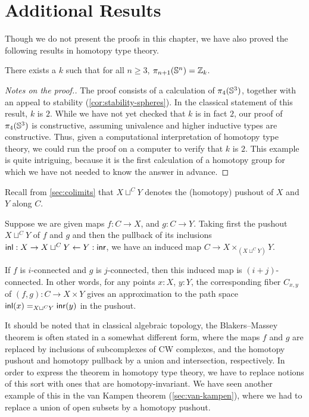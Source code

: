 \section{Additional Results}
\label{sec:moreresults}

Though we do not present the proofs in this chapter, we have also proved
the following results in homotopy type theory.  

\begin{thm}
There exists a $k$ such that for all $n \ge 3$, $\pi_{n+1}(\Sn ^n) =
\Z_k$.  
\end{thm}

\begin{proof}[Notes on the proof.]
The proof consists of a calculation of $\pi_4(\Sn ^3)$, together with an
appeal to stability (\cref{cor:stability-spheres}).  In the classical
statement of this result, $k$ is $2$.  While we have not yet checked that
$k$ is in fact $2$, our proof of $\pi_4(\Sn ^3)$ is constructive, assuming
univalence and higher inductive types are constructive.  Thus, given a
computational interpretation of homotopy type theory, we could run the
proof on a computer to verify that $k$ is $2$.  This example is quite
intriguing, because it is the first calculation of a homotopy group
for which we have not needed to know the answer in advance.
\end{proof}

Recall from \autoref{sec:colimits} that $X \sqcup^C Y$ denotes the
(homotopy) pushout of $X$ and $Y$ along $C$.
%

\begin{thm}\label{Blakers-Massey}
  Suppose we are given maps $f : C  \rightarrow X$, and $g : C \rightarrow Y$. Taking first the pushout $X \sqcup^C Y $ of $f$ and $g$ and then the pullback of its inclusions $\inl : X \rightarrow X \sqcup^C Y \leftarrow Y : \inr$, we have an induced map $C \to X \times_{(X \sqcup^C Y)} Y$.

  If $f$ is $i$-connected and $g$ is $j$-connected, then this induced map is $(i+j)$-connected. In other words, for any points $x:X$, $y:Y$, the corresponding fiber $C_{x,y}$ of $(f,g) : C \to X \times Y $ gives an approximation to the path space $\id[X \sqcup^C Y]{\inl(x)}{\inr(y)}$ in the pushout.
\end{thm}

It should be noted that in classical algebraic topology, the Blakers--Massey theorem is often stated in a somewhat different form, where the maps $f$ and $g$ are replaced by inclusions of subcomplexes of CW complexes, and the homotopy pushout and homotopy pullback by a union and intersection, respectively.
In order to express the theorem in homotopy type theory, we have to replace notions of this sort with ones that are homotopy-invariant.
We have seen another example of this in the van Kampen theorem (\autoref{sec:van-kampen}), where we had to replace a union of open subsets by a homotopy pushout.

